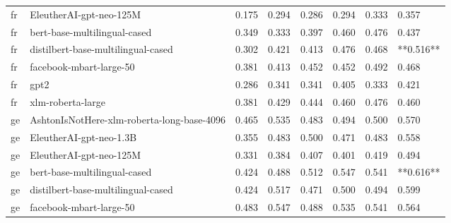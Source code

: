 \begin{tabular}{llllllll}
      fr &                    EleutherAI-gpt-neo-125M & 0.175 &                     0.294 &                 0.286 &                  0.294 &                                   0.333 &     0.357 \\
      fr &               bert-base-multilingual-cased & 0.349 &                     0.333 &                 0.397 &                  0.460 &                                   0.476 &     0.437 \\
      fr &         distilbert-base-multilingual-cased & 0.302 &                     0.421 &                 0.413 &                  0.476 &                                   0.468 & **0.516** \\
      fr &                    facebook-mbart-large-50 & 0.381 &                     0.413 &                 0.452 &                  0.452 &                                   0.492 &     0.468 \\
      fr &                                       gpt2 & 0.286 &                     0.341 &                 0.341 &                  0.405 &                                   0.333 &     0.421 \\
      fr &                          xlm-roberta-large & 0.381 &                     0.429 &                 0.444 &                  0.460 &                                   0.476 &     0.460 \\
      ge & AshtonIsNotHere-xlm-roberta-long-base-4096 & 0.465 &                     0.535 &                 0.483 &                  0.494 &                                   0.500 &     0.570 \\
      ge &                    EleutherAI-gpt-neo-1.3B & 0.355 &                     0.483 &                 0.500 &                  0.471 &                                   0.483 &     0.558 \\
      ge &                    EleutherAI-gpt-neo-125M & 0.331 &                     0.384 &                 0.407 &                  0.401 &                                   0.419 &     0.494 \\
      ge &               bert-base-multilingual-cased & 0.424 &                     0.488 &                 0.512 &                  0.547 &                                   0.541 & **0.616** \\
      ge &         distilbert-base-multilingual-cased & 0.424 &                     0.517 &                 0.471 &                  0.500 &                                   0.494 &     0.599 \\
      ge &                    facebook-mbart-large-50 & 0.483 &                     0.547 &                 0.488 &                  0.535 &                                   0.541 &     0.564 \\

\end{tabular}
